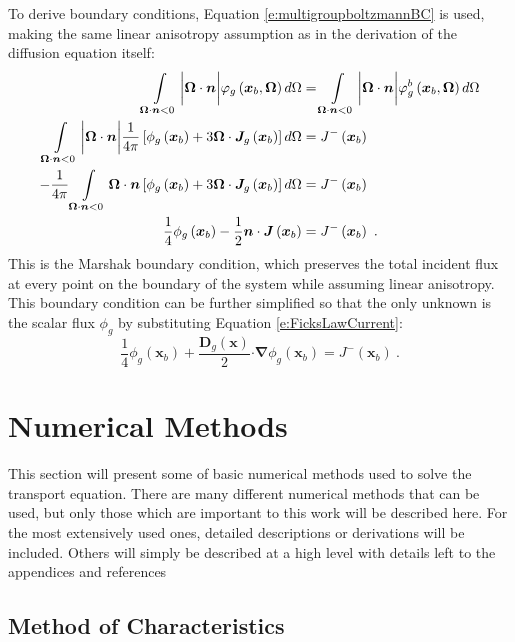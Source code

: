 To derive boundary conditions, Equation \ref{e:multigroupboltzmannBC} is used, making the same linear anisotropy assumption as in the derivation of the diffusion equation itself:
\begin{align}
\intop_{\bm \Omega \cdot \bm n < 0} \bigg|\bm \Omega \cdot \bm n\bigg|\varphi_g\left(\bm x_b, \bm \Omega\right) d\Omega &= \intop_{\bm \Omega \cdot \bm n < 0} \bigg|\bm \Omega \cdot \bm n\bigg|\varphi_g^b\left(\bm x_b, \bm \Omega\right) d\Omega \nonumber \\
\intop_{\bm \Omega \cdot \bm n < 0} \bigg|\bm \Omega \cdot \bm n\bigg| \frac{1}{4\pi} \left[\phi_g\left(\bm x_b\right) + 3\bm \Omega \cdot \bm J_g\left(\bm x_b\right)\right] d\Omega &= J^-\left(\bm x_b\right) \nonumber \\
-\frac{1}{4\pi}\intop_{\bm \Omega \cdot \bm n < 0} \bm \Omega \cdot \bm n \left[\phi_g\left(\bm x_b\right) + 3\bm \Omega \cdot \bm J_g\left(\bm x_b\right)\right] d\Omega &= J^-\left(\bm x_b\right) \nonumber \\
\frac{1}{4} \phi_g\left(\bm x_b\right) - \frac{1}{2} \bm n \cdot \bm J\left(\bm x_b\right) &= J^-\left(\bm x_b\right)\ .
\end{align}
This is the Marshak boundary condition, which preserves the total incident flux at every point on the boundary of the system while assuming linear anisotropy.  This boundary condition can be further simplified so that the only unknown is the scalar flux $\phi_g$ by substituting Equation \ref{e:FicksLawCurrent}:
\begin{equation}\label{e:DiffusionEquationBC}
\frac{1}{4} \phi_g\left(\bm x_b\right) + \frac{\bm D_g\left(\bm x\right)}{2} \bm \cdot \bm \nabla \phi_g\left(\bm x_b\right) = J^-\left(\bm x_b\right)\ .
\end{equation}

\section{Numerical Methods}

This section will present some of basic numerical methods used to solve the transport equation.  There are many different numerical methods that can be used, but only those which are important to this work will be described here.  For the most extensively used ones, detailed descriptions or derivations will be included.  Others will simply be described at a high level with details left to the appendices and references

\subsection{Method of Characteristics}\label{ss:MOCtheory}

